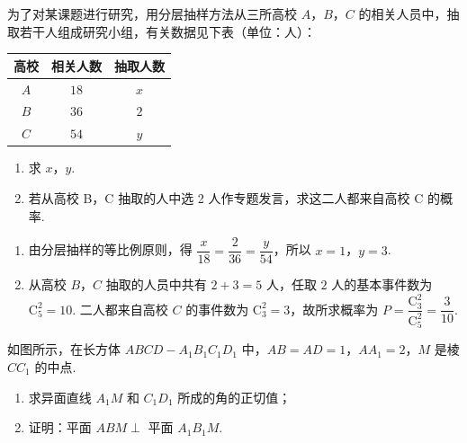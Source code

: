 \begin{problem}
为了对某课题进行研究，用分层抽样方法从三所高校 \(A\)，\(B\)，\(C\) 的相关人员中，抽取若干人组成研究小组，有关数据见下表（单位：人）：

\begin{center}
\begin{tabular}{c|c|c}
高校 & 相关人数 & 抽取人数 \\
\hline
\(A\) & \(18\) & \(x\) \\
\(B\) & \(36\) & \(2\) \\
\(C\) & \(54\) & \(y\)
\end{tabular}
\end{center}

\begin{enumerate}
\item 求 \(x\)，\(y\).
\item 若从高校 B，C 抽取的人中选 2 人作专题发言，求这二人都来自高校 C 的概率.
\end{enumerate}
\end{problem}

\begin{solution}
\begin{enumerate}
\item 由分层抽样的等比例原则，得 \(\dfrac{x}{18}=\dfrac{2}{36}=\dfrac{y}{54}\)，所以 \(x=1\)，\(y=3\).
\item 从高校 \(B\)，\(C\) 抽取的人员中共有 \(2+3=5\) 人，任取 \(2\) 人的基本事件数为 \(\mathrm C_5^2=10\). 二人都来自高校 \(C\) 的事件数为 \(\mathrm C_3^2=3\)，故所求概率为 \(P=\dfrac{\mathrm C_3^2}{\mathrm C_5^2}=\dfrac{3}{10}\).
\end{enumerate}
\end{solution}

\begin{problem}
如图所示，在长方体 \(ABCD-A_{1}B_{1}C_{1}D_{1}\) 中，\(AB = AD = 1\)，\(AA_{1} = 2\)，\(M\) 是棱 \(CC_{1}\) 的中点.
\begin{enumerate}
\item 求异面直线 \(A_{1}M\) 和 \(C_{1}D_{1}\) 所成的角的正切值；
\item 证明：平面 \(ABM \perp\) 平面 \(A_{1}B_{1}M\).
\end{enumerate}

\end{problem}

